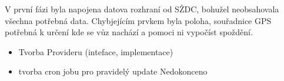 V první fázi byla napojena datova rozhraní od SŽDC, bohužel neobsahovala všechna potřebná data. Chybjejícím prvkem byla poloha, souřadnice GPS potřebná k určení kde se vůz nachází a pomoci ni vypočíst spoždění.
\begin{itemize}
	\setlength{\parskip}{0pt}
	\setlength{\itemsep}{0pt}
	\item Tvorba Provideru (inteface, implementace)
	
	
	\item tvorba cron jobu pro pravidelý update
	Nedokonceno
\end{itemize}

